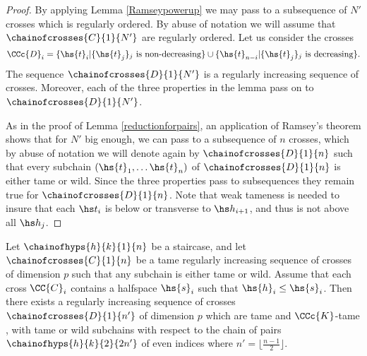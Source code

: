 \begin{proof}
	By applying Lemma \ref{Ramseypowerup} we may pass to a subsequence of $N'$ crosses which is regularly ordered. By abuse of notation we will assume that $\chainofcrosses{C}{1}{N'}$ are regularly ordered.
	Let us consider the crosses
	$$\CCc{D}_i= \{\hs{t}_i | \{\hs{t}_j\}_j \text{ is non-decreasing}\} \cup \{\hs{t}_{n-i} | \{\hs{t}_j\}_j\text{ is decreasing}\}.$$
	The sequence $\chainofcrosses{D}{1}{N'}$ is a regularly increasing sequence of crosses. Moreover, each of the three properties in the lemma pass on to $\chainofcrosses{D}{1}{N'}$.
	
	As in the proof of Lemma \ref{reductionforpairs}, an application of Ramsey's theorem shows that for $N'$ big enough, we can pass to a subsequence of $n$  crosses, which by abuse of notation we will denote again by $\chainofcrosses{D}{1}{n}$ such that every subchain $(\hs{t}_1, \dots \hs{t}_n)$ of $\chainofcrosses{D}{1}{n}$ is either tame or wild. 
	Since the three properties pass to subsequences they remain true for $\chainofcrosses{D}{1}{n}$. 
	Note that weak tameness is needed to insure that each $\hs t_i$ is below or transverse to $\hs h_{i+1}$, and thus is not above all $\hs h_{j}$.
\end{proof}

\begin{lemma}\label{vertical horizontal trick}
	Let $\chainofhyps{h}{k}{1}{n}$ be a staircase, and let $\chainofcrosses{C}{1}{n}$ be a tame regularly increasing sequence of crosses of dimension $p$ such that any subchain is either tame or wild. Assume that each cross $\CC{C}_i$ contains a halfspace $\hs{s}_i$ such that $\hs{h}_i\leq\hs{s}_i$. Then there exists a regularly increasing  sequence of crosses $\chainofcrosses{D}{1}{n'}$ of dimension $p$ which are tame and $\CCc{K}$-tame \intc, with tame or wild subchains with respect to the chain of pairs $\chainofhyps{h}{k}{2}{2n'}$ of even indices where $n' =\lfloor\frac{ n-1}{2} \rfloor$.
\end{lemma}
 

